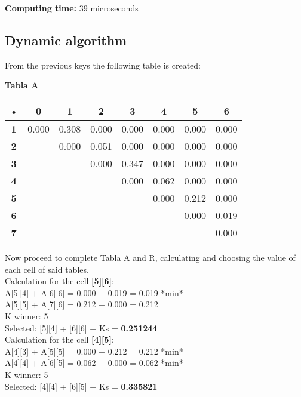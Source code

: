 \documentclass[a4paper,twocolumn,10pt]{article}
\newcommand\tab[1][1cm]{\hspace*{#1}}
\newcommand\minitab[1][0.5cm]{\hspace*{#1}}
\begin{document}
\textbf{Computing time: } 39 microseconds 
\subsection{Dynamic algorithm} 

From the previous keys the following table is created: \\ 
\begin{center} 
\textbf{Tabla A} \\ 
\begin{tabular}{|c|c|c|c|c|c|c|c|}
\hline \textbf{•} & \textbf{0}& \textbf{1}& \textbf{2}& \textbf{3}& \textbf{4}& \textbf{5}& \textbf{6}\\ \hline 
\textbf{1} & 0.000 & 0.308 & 0.000 & 0.000 & 0.000 & 0.000 & 0.000 \\ 
\hline 
\textbf{2} &  & 0.000 & 0.051 & 0.000 & 0.000 & 0.000 & 0.000 \\ 
\hline 
\textbf{3} &  &  & 0.000 & 0.347 & 0.000 & 0.000 & 0.000 \\ 
\hline 
\textbf{4} &  &  &  & 0.000 & 0.062 & 0.000 & 0.000 \\ 
\hline 
\textbf{5} &  &  &  &  & 0.000 & 0.212 & 0.000 \\ 
\hline 
\textbf{6} &  &  &  &  &  & 0.000 & 0.019 \\ 
\hline 
\textbf{7} &  &  &  &  &  &  & 0.000 \\ 
\hline 
\end{tabular} 
\end{center} 
Now proceed to complete Tabla A and R, calculating and choosing the value of each cell of said tables. \\ 
 
Calculation for the cell \textbf{[5][6]}: \\ 
\tab A[5][4] + A[6][6] = 0.000 + 0.019 = 0.019 *min*\\ 
\tab A[5][5] + A[7][6] = 0.212 + 0.000 = 0.212\\ 
\minitab K winner: 5 \\ 
\minitab Selected: [5][4] + [6][6] + Ks = \textbf{0.251244} \\ 
 
Calculation for the cell \textbf{[4][5]}: \\ 
\tab A[4][3] + A[5][5] = 0.000 + 0.212 = 0.212 *min*\\ 
\tab A[4][4] + A[6][5] = 0.062 + 0.000 = 0.062 *min*\\ 
\minitab K winner: 5 \\ 
\minitab Selected: [4][4] + [6][5] + Ks = \textbf{0.335821} \\ 
 
\end{document}

